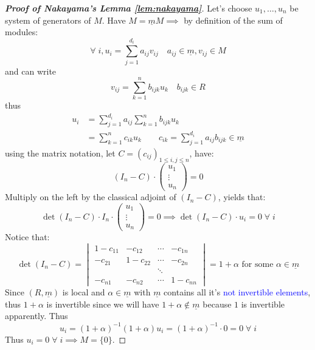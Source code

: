 \begin{proof}[\textbf{Proof of Nakayama's Lemma \ref{lem:nakayama}}]
	Let's choose \( u_1, \ldots, u_n \) be system of generators of \( M \). Have \( M = \underline{m}M
	\implies \) by definition of the sum of modules:
	\[
		\forall \; i, u_i = \sum_{j=1}^{d_i} a_{ij} v_{ij} \quad a_{ij} \in \underline{m}, v_{ij} \in M
	\]
	and can write
	\[
		v_{ij} = \sum_{k=1}^n b_{ijk} u_k \quad b_{ijk} \in R
	\]
	thus
	\[
		\begin{aligned}
			u_i & = \sum_{j=1}^{d_i} a_{ij} \sum_{k=1}^n b_{ijk} u_k                            \\
			    & = \sum_{k=1}^n c_{ik} u_k \qquad c_{ik} = \sum_{j=1}^{d_i} a_{ij} b_{ijk} \in
			\underline{m}
		\end{aligned}
	\]
	using the matrix notation, let \( C = (c_{ij})_{1\leq i, j \leq n} \), have:
	\[
		(I_n - C) \cdot
		\begin{pmatrix}
			u_1    \\
			\vdots \\

			u_n
		\end{pmatrix} = 0
	\]
	Multiply on the left by the classical adjoint of \( (I_n - C) \), yields that:
	\[
		\det(I_n - C) \cdot I_n \cdot
		\begin{pmatrix}
			u_1    \\
			\vdots \\
			u_n
		\end{pmatrix} = 0 \implies \det(I_n - C) \cdot u_i = 0 \; \forall \; i
	\]
	Notice that:
	\[
		\det (I_n - C) =
		\begin{vmatrix}
			1-c_{11} & - c_{12} & \cdots & -c_{1n}  \\
			-c_{21}  & 1-c_{22} & \cdots & -c_{2n}  \\
			         &          & \ddots &          \\
			-c_{n 1} & -c_{n 2} & \cdots & 1-c_{nn}
		\end{vmatrix} = 1 + \alpha \text{ for some } \alpha \in \underline{m}
	\]
	Since \( (R, \underline{m}) \) is local and \( \alpha \in \underline{m} \) with \( \underline{m} \)
	contains all it's \textcolor{blue}{not invertible elements}, thus \( 1 + \alpha \) is invertible
	since we will have \( 1 + \alpha \not\in \underline{m} \) because \( 1 \) is invertible apparently.
	Thus
	\[
		u_i = (1+\alpha)^{-1} (1+\alpha) u_i = (1+\alpha)^{-1}\cdot 0 = 0\; \forall \; i
	\]
	Thus \( u_i = 0 \; \forall \; i \implies M = \{0\} \).
\end{proof}


